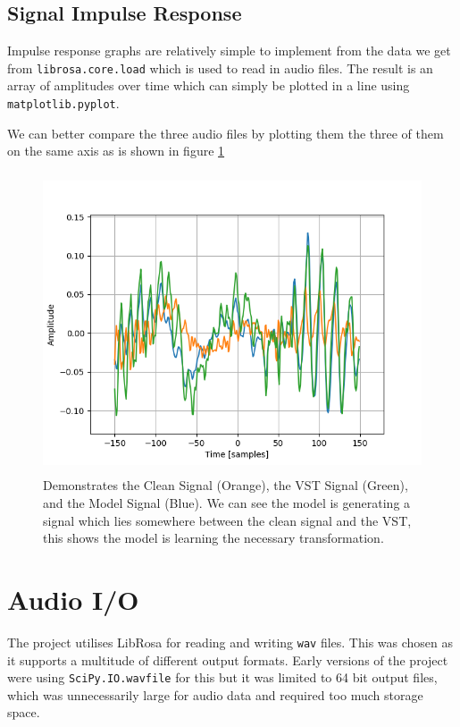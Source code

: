 \documentclass{l4proj}
\begin{document}
\subsection{Signal Impulse Response}\label{signal-impulse-response}

Impulse response graphs are relatively simple to implement from the data
we get from \texttt{librosa.core.load} which is used to read in audio
files. The result is an array of amplitudes over time which can simply
be plotted in a line using \texttt{matplotlib.pyplot}.

We can better compare the three audio files by plotting them the three
of them on the same axis as is shown in figure \ref{fig:axisshare}

\begin{figure}
\centering
\includegraphics[width=4.66700in,height=3.50000in]{images/axisshare.png}
\caption{Demonstrates the Clean Signal (Orange), the VST Signal (Green),
and the Model Signal (Blue). We can see the model is generating a signal
which lies somewhere between the clean signal and the VST, this shows
the model is learning the necessary
transformation.\label{fig:axisshare}}
\end{figure}

\section{Audio I/O}\label{audio-io}

The project utilises LibRosa for reading and writing \texttt{wav} files.
This was chosen as it supports a multitude of different output formats.
Early versions of the project were using \texttt{SciPy.IO.wavfile} for
this but it was limited to 64 bit output files, which was unnecessarily
large for audio data and required too much storage space.
\end{document}

